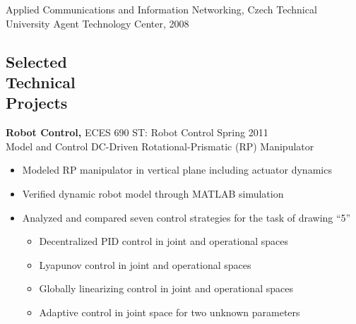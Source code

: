 \documentclass[margin]{res}
\begin{document}
\begin{resume}
\begin{educate}
\begin{list}{}{\leftmargin=1em}
\item Applied Communications and Information Networking, Czech Technical University Agent Technology Center, 2008 
\end{list}
\end{educate}

\begin{tech}
\section{Selected \\ Technical \\ Projects}
\end{tech}

\begin{tech}
\begin{controls}
{\bf Robot Control,} ECES 690 ST: Robot Control \hfill Spring 2011 \\
Model and Control DC-Driven Rotational-Prismatic (RP) Manipulator
\begin{itemize} \itemsep -2pt %
	\item Modeled RP manipulator in vertical plane including actuator dynamics
	\item Verified dynamic robot model through MATLAB simulation 
	\item Analyzed and compared seven control strategies for the task of drawing ``5''
		\vspace{-2mm}
		\begin{itemize} \itemsep -2pt %
		\item Decentralized PID control in joint and operational spaces
		\item Lyapunov control in joint and operational spaces
		\item Globally linearizing control in joint and operational spaces
		\item Adaptive control in joint space for two unknown parameters
		\end{itemize} \vspace{-2mm}
\end{itemize}
\end{controls}
\end{tech}


\end{resume}
\end{document}
